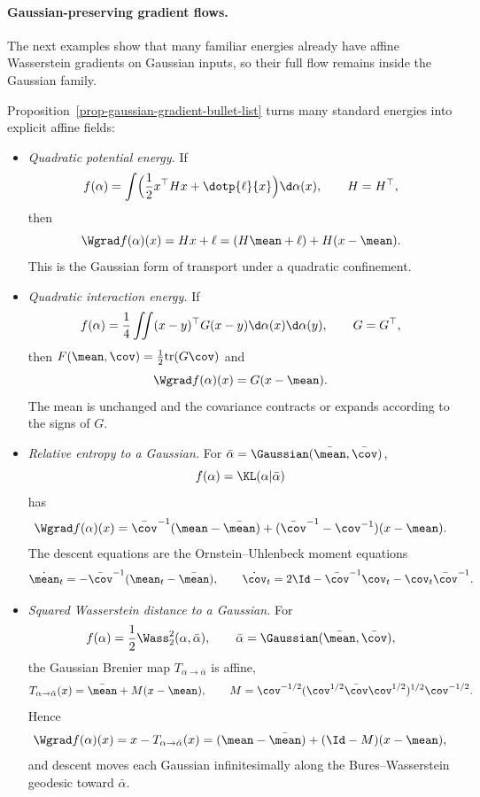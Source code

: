 \paragraph{Gaussian-preserving gradient flows.}

The next examples show that many familiar energies already have affine Wasserstein gradients on Gaussian inputs, so their full flow remains inside the Gaussian family.

\begin{example}\label{ex-gaussian-affine-gradients}
	Proposition~\ref{prop-gaussian-gradient-bullet-list} turns many standard energies into explicit affine fields:
	\begin{itemize}
		\item \emph{Quadratic potential energy.} If
		\[
			f(\alpha)=\int \Bigl(\frac12 x^\top Hx+\dotp{\ell}{x}\Bigr)\d\alpha(x),
			\qquad H=H^\top,
		\]
		then
		\[
			\Wgrad f(\alpha)(x)=Hx+\ell=(H\mean+\ell)+H(x-\mean).
		\]
		This is the Gaussian form of transport under a quadratic confinement.

		\item \emph{Quadratic interaction energy.} If
		\[
			f(\alpha)=\frac14\iint (x-y)^\top G(x-y)\d\alpha(x)\d\alpha(y),
			\qquad G=G^\top,
		\]
		then $F(\mean,\cov)=\frac12\mathrm{tr}(G\cov)$ and
		\[
			\Wgrad f(\alpha)(x)=G(x-\mean).
		\]
		The mean is unchanged and the covariance contracts or expands according to the signs of $G$.

		\item \emph{Relative entropy to a Gaussian.} For $\bar\alpha=\Gaussian(\bar\mean,\bar\cov)$,
		\[
			f(\alpha)=\KL(\alpha|\bar\alpha)
		\]
		has
		\[
			\Wgrad f(\alpha)(x)
			=
			\bar\cov^{-1}(\mean-\bar\mean)
			+
			(\bar\cov^{-1}-\cov^{-1})(x-\mean).
		\]
		The descent equations are the Ornstein--Uhlenbeck moment equations
		\[
			\dot\mean_t=-\bar\cov^{-1}(\mean_t-\bar\mean),
			\qquad
			\dot\cov_t=2\Id-\bar\cov^{-1}\cov_t-\cov_t\bar\cov^{-1}.
		\]

		\item \emph{Squared Wasserstein distance to a Gaussian.} For
		\[
			f(\alpha)=\frac12\Wass_2^2(\alpha,\bar\alpha),
			\qquad
			\bar\alpha=\Gaussian(\bar\mean,\bar\cov),
		\]
		the Gaussian Brenier map $T_{\alpha\to\bar\alpha}$ is affine,
		\[
			T_{\alpha\to\bar\alpha}(x)=\bar\mean+M(x-\mean),
			\qquad
			M=\cov^{-1/2}(\cov^{1/2}\bar\cov\cov^{1/2})^{1/2}\cov^{-1/2}.
		\]
		Hence
		\[
			\Wgrad f(\alpha)(x)=x-T_{\alpha\to\bar\alpha}(x)
			=
			(\mean-\bar\mean)+(\Id-M)(x-\mean),
		\]
		and descent moves each Gaussian infinitesimally along the Bures--Wasserstein geodesic toward $\bar\alpha$.


\end{itemize}
\end{example}
